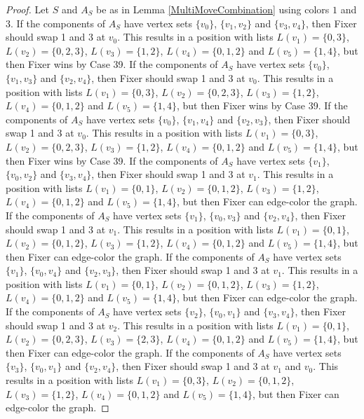 \documentclass[12pt]{amsart}
\theoremstyle{plain}
\theoremstyle{definition}
\theoremstyle{remark}
\begin{document}
\begin{proof}
Let $S$ and $A_S$ be as in Lemma \ref{MultiMoveCombination} using colors $1$ and $3$. If the components of $A_S$ have vertex sets $\{v_0\}$, $\{v_1, v_2\}$ and $\{v_3, v_4\}$, then Fixer should swap 1 and 3 at $v_0$. This results in a position with lists $L(v_1) = \{0, 3\}$, $L(v_2) = \{0, 2, 3\}$, $L(v_3) = \{1, 2\}$, $L(v_4) = \{0, 1, 2\}$ and $L(v_5) = \{1, 4\}$, but then Fixer wins by Case 39.
If the components of $A_S$ have vertex sets $\{v_0\}$, $\{v_1, v_3\}$ and $\{v_2, v_4\}$, then Fixer should swap 1 and 3 at $v_0$. This results in a position with lists $L(v_1) = \{0, 3\}$, $L(v_2) = \{0, 2, 3\}$, $L(v_3) = \{1, 2\}$, $L(v_4) = \{0, 1, 2\}$ and $L(v_5) = \{1, 4\}$, but then Fixer wins by Case 39.
If the components of $A_S$ have vertex sets $\{v_0\}$, $\{v_1, v_4\}$ and $\{v_2, v_3\}$, then Fixer should swap 1 and 3 at $v_0$. This results in a position with lists $L(v_1) = \{0, 3\}$, $L(v_2) = \{0, 2, 3\}$, $L(v_3) = \{1, 2\}$, $L(v_4) = \{0, 1, 2\}$ and $L(v_5) = \{1, 4\}$, but then Fixer wins by Case 39.
If the components of $A_S$ have vertex sets $\{v_1\}$, $\{v_0, v_2\}$ and $\{v_3, v_4\}$, then Fixer should swap 1 and 3 at $v_1$. This results in a position with lists $L(v_1) = \{0, 1\}$, $L(v_2) = \{0, 1, 2\}$, $L(v_3) = \{1, 2\}$, $L(v_4) = \{0, 1, 2\}$ and $L(v_5) = \{1, 4\}$, but then Fixer can edge-color the graph.
If the components of $A_S$ have vertex sets $\{v_1\}$, $\{v_0, v_3\}$ and $\{v_2, v_4\}$, then Fixer should swap 1 and 3 at $v_1$. This results in a position with lists $L(v_1) = \{0, 1\}$, $L(v_2) = \{0, 1, 2\}$, $L(v_3) = \{1, 2\}$, $L(v_4) = \{0, 1, 2\}$ and $L(v_5) = \{1, 4\}$, but then Fixer can edge-color the graph.
If the components of $A_S$ have vertex sets $\{v_1\}$, $\{v_0, v_4\}$ and $\{v_2, v_3\}$, then Fixer should swap 1 and 3 at $v_1$. This results in a position with lists $L(v_1) = \{0, 1\}$, $L(v_2) = \{0, 1, 2\}$, $L(v_3) = \{1, 2\}$, $L(v_4) = \{0, 1, 2\}$ and $L(v_5) = \{1, 4\}$, but then Fixer can edge-color the graph.
If the components of $A_S$ have vertex sets $\{v_2\}$, $\{v_0, v_1\}$ and $\{v_3, v_4\}$, then Fixer should swap 1 and 3 at $v_2$. This results in a position with lists $L(v_1) = \{0, 1\}$, $L(v_2) = \{0, 2, 3\}$, $L(v_3) = \{2, 3\}$, $L(v_4) = \{0, 1, 2\}$ and $L(v_5) = \{1, 4\}$, but then Fixer can edge-color the graph.
If the components of $A_S$ have vertex sets $\{v_3\}$, $\{v_0, v_1\}$ and $\{v_2, v_4\}$, then Fixer should swap 1 and 3 at $v_1$ and $v_0$. This results in a position with lists $L(v_1) = \{0, 3\}$, $L(v_2) = \{0, 1, 2\}$, $L(v_3) = \{1, 2\}$, $L(v_4) = \{0, 1, 2\}$ and $L(v_5) = \{1, 4\}$, but then Fixer can edge-color the graph.

\end{proof}
\end{document}

